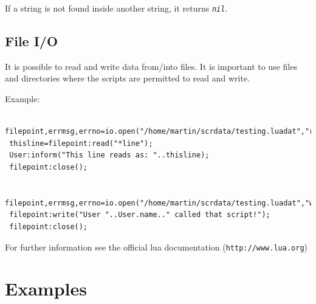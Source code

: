 \documentclass[a4paper,10pt,makeidx]{scrreprt}
\newcommand{\lua}[1]{\index{#1}\texttt{\emph{#1}}}
\begin{document}
If a string is not found inside another string, it returns \lua{nil}.
\section{File I/O}
It is possible to read and write data from/into files. It is important to use files and directories where the
scripts are permitted to read and write.

Example:
\begin{verbatim}
 filepoint,errmsg,errno=io.open("/home/martin/scrdata/testing.luadat","r");
 thisline=filepoint:read("*line");
 User:inform("This line reads as: "..thisline);
 filepoint:close();

 filepoint,errmsg,errno=io.open("/home/martin/scrdata/testing.luadat","w+");
 filepoint:write("User "..User.name.." called that script!");
 filepoint:close();
\end{verbatim}
For further information see the official lua documentation ({\tt http://www.lua.org})

\chapter{Examples}
\end{document}
